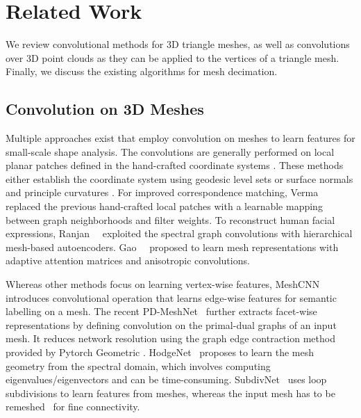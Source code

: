 \section{Related Work}\label{sec:references}
{\color{black}
We review convolutional methods for 3D triangle meshes, as well as convolutions over 3D point clouds as they can be applied to the vertices of a triangle mesh. Finally, we discuss the existing algorithms for mesh decimation.

\vspace{-1mm}
\subsection{Convolution on 3D Meshes}\label{subsec:convolution_mesh}
Multiple approaches exist that employ convolution on meshes to learn features for small-scale shape analysis. 
The convolutions are generally performed  on local planar patches defined in the hand-crafted coordinate systems \cite{boscaini2016learning,masci2015geodesic,monti2017geometric}. These methods either establish the coordinate system using  geodesic level sets \cite{masci2015geodesic}
or surface normals and principle curvatures \cite{boscaini2016learning,monti2017geometric}.
For improved correspondence matching, Verma \etal \cite{verma2018feastnet} replaced the previous hand-crafted local patches with a learnable
mapping between graph neighborhoods and filter weights.
To reconstruct human facial expressions, Ranjan~\etal~\cite{ranjan2018generating} exploited the spectral graph convolutions \cite{defferrard2016convolutional} with hierarchical mesh-based autoencoders. Gao~\etal~\cite{gao2022robust} proposed to learn mesh representations with adaptive attention matrices and anisotropic convolutions.

Whereas other methods focus on learning vertex-wise features,
MeshCNN~\cite{hanocka2019meshcnn} introduces convolutional operation that learns edge-wise features for semantic labelling on a mesh. The recent PD-MeshNet~\cite{milano2020primal} further extracts facet-wise representations by defining convolution on the primal-dual graphs of an input mesh. It reduces network resolution using the graph edge contraction method provided by Pytorch Geometric \cite{fey2019fast}. HodgeNet~\cite{smirnov2021hodgenet} proposes to learn the mesh geometry from the spectral domain, which involves computing eigenvalues/eigenvectors and can be time-consuming. SubdivNet~\cite{hu2022subdivision} uses loop subdivisions to learn features from meshes, whereas the input mesh has to be remeshed~\cite{liu2020neural} for fine connectivity.

}
